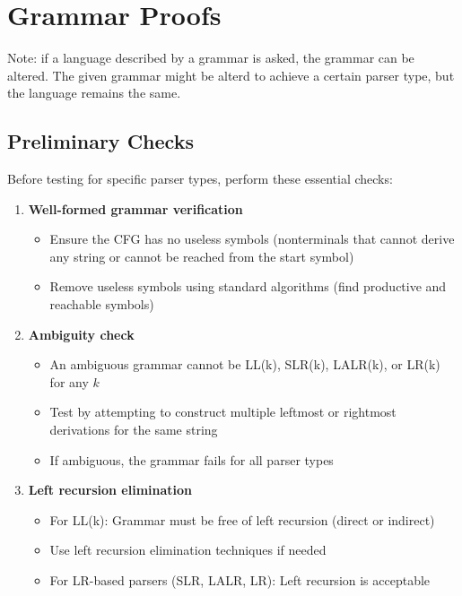
\section{Grammar Proofs}

Note: if a language described by a grammar is asked, the grammar can be altered. The given grammar might be alterd to achieve a certain parser type, but the language remains the same.

\subsection{Preliminary Checks}

Before testing for specific parser types, perform these essential checks:

\begin{enumerate}
    \item \textbf{Well-formed grammar verification}
    \begin{itemize}
        \item Ensure the CFG has no useless symbols (nonterminals that cannot derive any string or cannot be reached from the start symbol)
        \item Remove useless symbols using standard algorithms (find productive and reachable symbols)
    \end{itemize}

    \item \textbf{Ambiguity check}
    \begin{itemize}
        \item An ambiguous grammar cannot be LL(k), SLR(k), LALR(k), or LR(k) for any $k$
        \item Test by attempting to construct multiple leftmost or rightmost derivations for the same string
        \item If ambiguous, the grammar fails for all parser types
    \end{itemize}

    \item \textbf{Left recursion elimination}
    \begin{itemize}
        \item For LL(k): Grammar must be free of left recursion (direct or indirect)
        \item Use left recursion elimination techniques if needed
        \item For LR-based parsers (SLR, LALR, LR): Left recursion is acceptable
    \end{itemize}
\end{enumerate}

